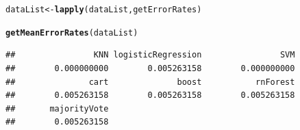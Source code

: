 \documentclass[a4paper,draft=false]{scrreprt}\usepackage[]{graphicx}\usepackage[]{color}
\makeatletter
\newcommand{\hlstd}[1]{\textcolor[rgb]{0.345,0.345,0.345}{#1}}%
\newcommand{\hlkwb}[1]{\textcolor[rgb]{0.69,0.353,0.396}{#1}}%
\newcommand{\hlkwd}[1]{\textcolor[rgb]{0.737,0.353,0.396}{\textbf{#1}}}%
\newenvironment{kframe}{%
 \def\at@end@of@kframe{}%
 \ifinner\ifhmode%
  \def\at@end@of@kframe{\end{minipage}}%
  \begin{minipage}{\columnwidth}%
 \fi\fi%
 \def\FrameCommand##1{\hskip\@totalleftmargin \hskip-\fboxsep
 \colorbox{shadecolor}{##1}\hskip-\fboxsep
     \hskip-\linewidth \hskip-\@totalleftmargin \hskip\columnwidth}%
 \MakeFramed {\advance\hsize-\width
   \@totalleftmargin\z@ \linewidth\hsize
   \@setminipage}}%
 {\par\unskip\endMakeFramed%
 \at@end@of@kframe}
\newenvironment{knitrout}{}{} %
\makeatother
\begin{document}
\begin{knitrout}
\begin{kframe}
\begin{alltt}
\hlstd{dataList} \hlkwb{<-} \hlkwd{lapply}\hlstd{(dataList, getErrorRates)}

\hlkwd{getMeanErrorRates}\hlstd{(dataList)}
\end{alltt}
\begin{verbatim}
##                KNN logisticRegression                SVM 
##        0.000000000        0.005263158        0.000000000 
##               cart              boost           rnForest 
##        0.005263158        0.005263158        0.005263158 
##       majorityVote 
##        0.005263158
\end{verbatim}
\end{kframe}
\end{knitrout}

\nocite{*}


\end{document}

